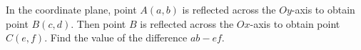 In the coordinate plane, point $A(a,b)$ is reflected across the $Oy$-axis to obtain point $B(c,d)$. Then point $B$ is reflected across the $Ox$-axis to obtain point $C(e,f)$. Find the value of the difference $ab-ef$.
